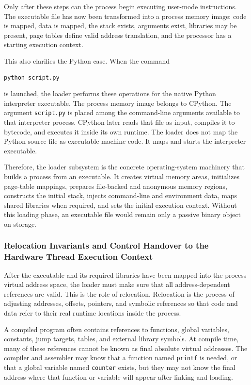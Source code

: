 Only after these steps can the process begin executing user-mode instructions. The executable file has now been transformed into a process memory image: code is mapped, data is mapped, the stack exists, arguments exist, libraries may be present, page tables define valid address translation, and the processor has a starting execution context.

This also clarifies the Python case. When the command

\begin{verbatim}
python script.py
\end{verbatim}

is launched, the loader performs these operations for the native Python interpreter executable. The process memory image belongs to CPython. The argument \texttt{script.py} is placed among the command-line arguments available to that interpreter process. CPython later reads that file as input, compiles it to bytecode, and executes it inside its own runtime. The loader does not map the Python source file as executable machine code. It maps and starts the interpreter executable.

Therefore, the loader subsystem is the concrete operating-system machinery that builds a process from an executable. It creates virtual memory areas, initializes page-table mappings, prepares file-backed and anonymous memory regions, constructs the initial stack, injects command-line and environment data, maps shared libraries when required, and sets the initial execution context. Without this loading phase, an executable file would remain only a passive binary object on storage.

\subsubsection{Relocation Invariants and Control Handover to the Hardware Thread Execution Context}

After the executable and its required libraries have been mapped into the process virtual address space, the loader must make sure that all address-dependent references are valid. This is the role of relocation. Relocation is the process of adjusting addresses, offsets, pointers, and symbolic references so that code and data refer to their real runtime locations inside the process.

A compiled program often contains references to functions, global variables, constants, jump targets, tables, and external library symbols. At compile time, many of these references cannot be known as final absolute virtual addresses. The compiler and assembler may know that a function named \texttt{printf} is needed, or that a global variable named \texttt{counter} exists, but they may not know the final address where that function or variable will appear after linking and loading.

